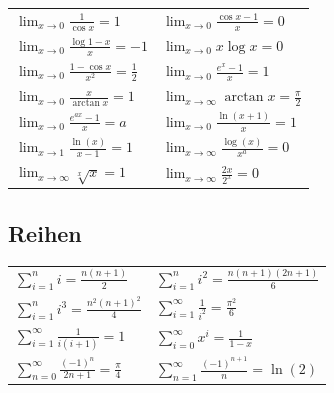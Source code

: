 \documentclass[7pt,landscape, margin = 0.1mm]{article}
\def\limxo{\lim_{x\to 0}}
\def\limxi{\lim_{x\to\infty}}
\begin{document}
\begin{multicols}{4}
\begin{center}
\begin{tabularx}{\linewidth}{XX}
    $\limxo \frac{1}{\cos x} = 1$ & $\limxo \frac{\cos x -1}{x} = 0$ \\
    $\limxo \frac{\log 1 - x}{x} = -1$ & $\limxo x \log x = 0$\\
    $\limxo \frac{1 - \cos x}{x^2} = \frac{1}{2}$ & $\limxo \frac{e^x-1}{x} = 1$ \\
    $\limxo \frac{x}{\arctan x} = 1$ & $\limxi \arctan x = \frac{\pi}{2}$ \\
    $\limxo \frac{e^{ax}-1}{x} = a$ & $\limxo \frac{\ln(x+1)}{x} = 1$ \\
    $\lim_{x\to 1} \frac{\ln(x)}{x-1} = 1$ & $\limxi \frac{\log(x)}{x^a} = 0$ \\
    $\limxi \sqrt[x]{x} = 1$ & $\limxi \frac{2x}{2^x} = 0$ \\
    \bottomrule
  \end{tabularx}
\end{center}

\subsection{Reihen}
\begin{center}
  \begin{tabularx}{\linewidth}{XX}
    \toprule
    $\sum_{i=1}^{n} i = \frac{n(n+1)}{2}$ & $\sum_{i=1}^{n} i^2 = \frac{n(n+1)(2n+1)}{6}$ \\
    $\sum_{i=1}^{n} i^3 = \frac{n^2 (n+1)^2}{4} $ & $\sum_{i=1}^{\infty} \frac{1}{i^2} = \frac{\pi ^2}{6}$ \\
    $\sum_{i=1}^{ \infty} \frac{1}{i (i+1	)} =1$ &$\sum_{i=0}^{\infty} x^i = \frac{1}{1-x}$\\
     $\sum_{n=0}^{\infty}\frac{(-1)^n}{2n+1} = \frac{\pi}{4}$& $\sum_{n=1}^{\infty}\frac{(-1)^{n+1}}{n} = \ln(2)$  \\
    
    
    \bottomrule
  \end{tabularx}
\end{center}





\end{multicols}
\end{document}
